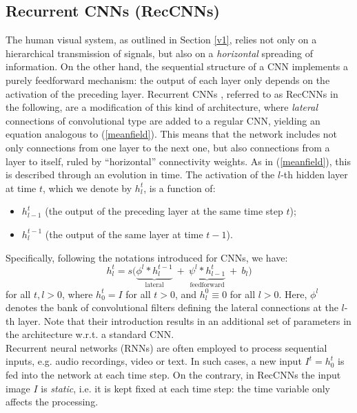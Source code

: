 \documentclass[11pt,oneside,reqno]{amsart}
\begin{document}
 \subsection{Recurrent CNNs (RecCNNs)}\label{reccnns}
 
 The human visual system, as outlined in Section \ref{v1}, relies not only on a hierarchical transmission of signals, but also on a \emph{horizontal} spreading of information. On the other hand, the sequential structure of a CNN implements a purely feedforward mechanism: the output of each layer only depends on the activation of the preceding layer. Recurrent CNNs \citep{liang,spoerer}, referred to as RecCNNs in the following, are a modification of this kind of architecture, where \emph{lateral} connections of convolutional type are added to a regular CNN, yielding an equation analogous to (\ref{meanfield}). This means that the network includes not only connections from one layer to the next one, but also connections from a layer to itself, ruled by ``horizontal'' connectivity weights. As in (\ref{meanfield}), this is described through an evolution in time. The activation of the $l$-th hidden layer at time $t$, which we denote by $h_l^t$, is a function of:
 \begin{itemize}
  \item $h_{l-1}^t$ (the output of the preceding layer at the same time step $t$);
  \item $h_l^{t-1}$ (the output of the same layer at time $t-1$).
 \end{itemize}
 Specifically, following the notations introduced for CNNs, we have:
 \begin{equation}\label{rcnnrule} h_l^t = s\big( \underbrace{\phi^l \ast h_l^{t-1}}_{\text{lateral}} \:+\: \underbrace{\psi^l \ast h_{l-1}^t}_{\text{feedforward}} \:+\: b_l \big)\end{equation}
 for all $t,l>0$, where $h_0^t = I$ for all $t>0$, and $h_l^0 \equiv 0$ for all $l>0$. Here, $\phi^l$ denotes the bank of convolutional filters defining the lateral connections at the $l$-th layer. Note that their introduction results in an additional set of parameters in the architecture w.r.t. a standard CNN.\\
 Recurrent neural networks (RNNs) are often employed to process sequential inputs, e.g. audio recordings, video or text. In such cases, a new input $I^t = h_0^t$ is fed into the network at each time step. On the contrary, in RecCNNs the input image $I$ is \emph{static}, i.e. it is kept fixed at each time step: the time variable only affects the processing.
 
\end{document}
